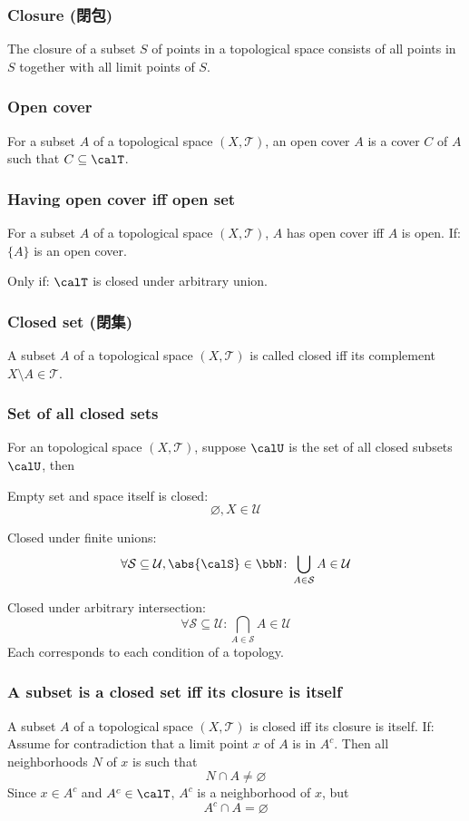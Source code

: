 \documentclass[a4paper,12pt]{article}
\begin{document}
\subsubsection{Closure (閉包)}
The closure of a subset $S$ of points in a topological space consists of all points in $S$ together with all limit points of $S$.
\subsubsection{Open cover}
For a subset $A$ of a topological space $(X,\mathcal{T})$, an open cover $A$ is a cover $C$ of $A$ such that $C\subseteq\calT$.
\subsubsection{Having open cover iff open set}
For a subset $A$ of a topological space $(X,\mathcal{T})$, $A$ has open cover iff $A$ is open.
\bpr
If: $\{A\}$ is an open cover.

Only if: $\calT$ is closed under arbitrary union.
\epr
\subsubsection{Closed set (閉集)}
A subset $A$ of a topological space $(X,\mathcal{T})$ is called closed iff its complement $X\setminus A\in\mathcal{T}$.
\subsubsection{Set of all closed sets}
For an topological space $(X,\mathcal{T})$, suppose $\calU$ is the set of all closed subsets $\calU$, then
\bit
\item Empty set and space itself is closed:
\[\varnothing,X\in\mathcal{U}\]
\item Closed under finite unions:
\[\forall\mathcal{S}\subseteq\mathcal{U},\abs{\calS}\in\bbN\colon\bigcup_{A\in\mathcal{S}}A\in\mathcal{U}\]
\item Closed under arbitrary intersection:
\[\forall\mathcal{S}\subseteq\mathcal{U}\colon\bigcap_{A\in\mathcal{S}}A\in\mathcal{U}\]
\eit
\bpr
Each corresponds to each condition of a topology.
\epr
\subsubsection{A subset is a closed set iff its closure is itself}
A subset $A$ of a topological space $(X,\mathcal{T})$ is closed iff its closure is itself.
\bpr
If: Assume for contradiction that a limit point $x$ of $A$ is in $A^c$. Then all neighborhoods $N$ of $x$ is such that
\[N\cap A\ne\varnothing\]
Since $x\in A^c$ and $A^c\in\calT$, $A^c$ is a neighborhood of $x$, but
\[A^c\cap A=\varnothing\]
\end{document}
